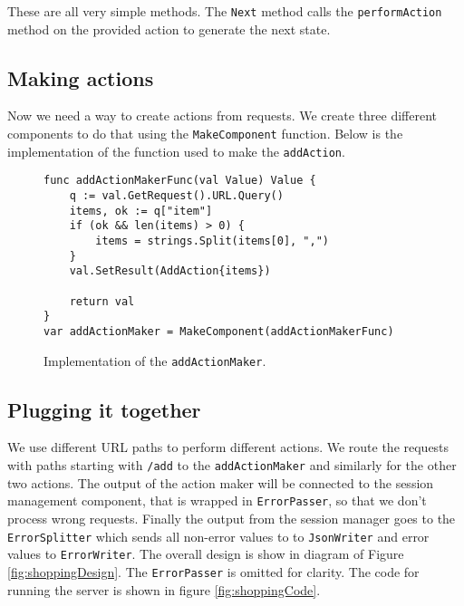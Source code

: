 These are all very simple methods. The \texttt{Next} method calls 
the \texttt{performAction} method on the provided action to generate 
the next state.

\subsection{Making actions}
Now we need a way to create actions from requests. We create three different
components to do that using the \texttt{MakeComponent} function. Below
is the implementation of the function used to make the \texttt{addAction}.
\begin{figure}[h]
\begin{lstlisting}
func addActionMakerFunc(val Value) Value {
    q := val.GetRequest().URL.Query()
    items, ok := q["item"]
    if (ok && len(items) > 0) {
        items = strings.Split(items[0], ",")
    }
    val.SetResult(AddAction{items})
    
    return val
}
var addActionMaker = MakeComponent(addActionMakerFunc) 
\end{lstlisting}
\caption[scale=1.0]{Implementation of the \texttt{addActionMaker}.}
\label{fig:addActionMaker}
\end{figure}

\subsection{Plugging it together}
We use different URL paths to perform different actions. We route the 
requests with paths starting with \texttt{/add} to the \texttt{addActionMaker}
and similarly for the other two actions. The output of the action maker
will be connected to the session management component, that is wrapped in
\texttt{ErrorPasser}, so that we don't process wrong requests.
Finally the output from the session manager goes to the \texttt{ErrorSplitter}
which sends all non-error values to to \texttt{JsonWriter} and error
values to \texttt{ErrorWriter}. The overall design is show in diagram 
of Figure \ref{fig:shoppingDesign}. The \texttt{ErrorPasser} is omitted 
for clarity. The code for running the server is shown in figure 
\ref{fig:shoppingCode}.

